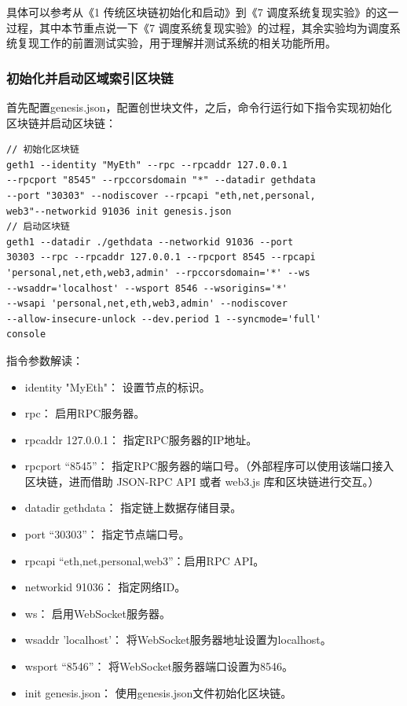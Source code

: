 具体可以参考从《1 传统区块链初始化和启动》到《7 调度系统复现实验》的这一过程，其中本节重点说一下《7 调度系统复现实验》的过程，其余实验均为调度系统复现工作的前置测试实验，用于理解并测试系统的相关功能所用。

\subsubsection{初始化并启动区域索引区块链}

首先配置genesis.json，配置创世块文件，之后，命令行运行如下指令实现初始化区块链并启动区块链：

\begin{verbatim}
// 初始化区块链
geth1 --identity "MyEth" --rpc --rpcaddr 127.0.0.1  
--rpcport "8545" --rpccorsdomain "*" --datadir gethdata 
--port "30303" --nodiscover --rpcapi "eth,net,personal,
web3"--networkid 91036 init genesis.json
// 启动区块链
geth1 --datadir ./gethdata --networkid 91036 --port 
30303 --rpc --rpcaddr 127.0.0.1 --rpcport 8545 --rpcapi 
'personal,net,eth,web3,admin' --rpccorsdomain='*' --ws 
--wsaddr='localhost' --wsport 8546 --wsorigins='*' 
--wsapi 'personal,net,eth,web3,admin' --nodiscover 
--allow-insecure-unlock --dev.period 1 --syncmode='full'
console
\end{verbatim}

指令参数解读：


\begin{itemize}
    \item identity "MyEth"：	设置节点的标识。
    \item rpc：					启用RPC服务器。
    \item rpcaddr 127.0.0.1：	指定RPC服务器的IP地址。
    \item rpcport “8545”：		指定RPC服务器的端口号。（外部程序可以使用该端口接入区块链，进而借助 JSON-RPC API 或者 web3.js 库和区块链进行交互。）
    \item datadir gethdata：	指定链上数据存储目录。
    \item port “30303”：		指定节点端口号。
    \item rpcapi “eth,net,personal,web3”：启用RPC API。
    \item networkid 91036：		指定网络ID。
    \item ws：		启用WebSocket服务器。
    \item wsaddr 'localhost'：  将WebSocket服务器地址设置为localhost。
    \item wsport “8546”：		将WebSocket服务器端口设置为8546。
    \item init genesis.json：	使用genesis.json文件初始化区块链。
\end{itemize}


